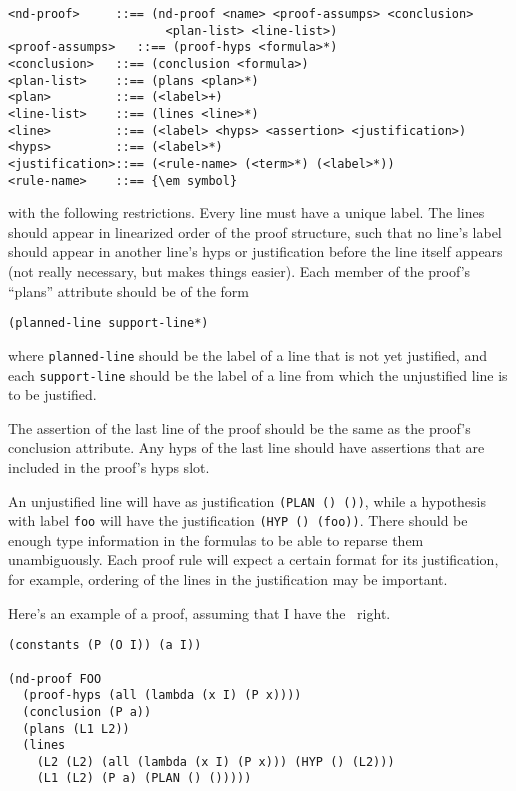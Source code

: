 \begin{verbatim}
<nd-proof>     ::== (nd-proof <name> <proof-assumps> <conclusion> 
                      <plan-list> <line-list>)
<proof-assumps>   ::== (proof-hyps <formula>*)
<conclusion>   ::== (conclusion <formula>)
<plan-list>    ::== (plans <plan>*)
<plan>         ::== (<label>+)
<line-list>    ::== (lines <line>*)
<line>         ::== (<label> <hyps> <assertion> <justification>)
<hyps>         ::== (<label>*)
<justification>::== (<rule-name> (<term>*) (<label>*))
<rule-name>    ::== {\em symbol}
\end{verbatim}
with the following restrictions.  Every line must have a unique label.
The lines should appear in linearized order 
of the proof structure, such that no line's label should appear in another
line's hyps or justification before the line itself appears (not really 
necessary, but makes things easier).  Each member of the proof's
``plans'' attribute should be of the form 
\begin{verbatim}
(planned-line support-line*)
\end{verbatim}
where {\tt planned-line} should be the label of a line that is not yet 
justified, and each {\tt support-line} should be the label of a line from which the
unjustified line is to be justified.  

The assertion of the last line of the proof should be the same as the
proof's conclusion attribute.  Any hyps of the last line should have
assertions that are included in the proof's hyps slot.  

An unjustified line will have as justification {\tt (PLAN () ())},
while a hypothesis with label {\tt foo} 
will have the justification {\tt (HYP () (foo))}.  There should be
enough
type information in the formulas to be able to reparse them unambiguously.
Each proof rule will expect a certain format for its justification,
for example, ordering of the lines in the justification may be important.

Here's an example of a proof, assuming that I have the \post\ right.
\begin{verbatim}
(constants (P (O I)) (a I))

(nd-proof FOO
  (proof-hyps (all (lambda (x I) (P x))))
  (conclusion (P a))
  (plans (L1 L2))
  (lines 
    (L2 (L2) (all (lambda (x I) (P x))) (HYP () (L2)))
    (L1 (L2) (P a) (PLAN () ()))))
\end{verbatim}
